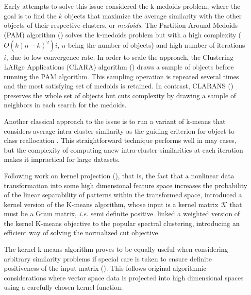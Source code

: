 \documentclass[10pt,journal,compsoc]{IEEEtran}
\begin{document}
Early attempts to solve this issue considered the k-medoids problem, where the goal is to find the $k$ objects that maximize the average similarity with the other objects of their respective clusters, or \emph{medoids}. The Partition Around Medoids (PAM) algorithm (\cite{KaufmanRousseeuw90}) solves the k-medoids problem but with a high complexity ($O(k(n-k)^2)i$, $n$ being the number of objects) and high number of iterations $i$, due to low convergence rate. In order to scale the approach, the Clustering LARge Applications (CLARA) algorithm (\cite{KaufmanRousseeuw90}) draws a sample of objects before running the PAM algorithm. This sampling operation is repeated several times and the most satisfying set of medoids is retained. In contrast, CLARANS (\cite{Ng:1994:EEC:645920.672827}) preserves the whole set of objects but cuts complexity by  drawing a sample of neighbors in each search for the medoids.

Another classical approach to the issue is to run a variant of k-means that considers average intra-cluster similarity as the guiding criterion for object-to-class reallocation \cite[Chapter 10.7]{Duda01}. This straightforward technique performs well in may cases, but the complexity of computing anew intra-cluster similarities at each iteration makes it impractical for large datasets.

Following work on kernel projection (\cite{Vapnik:1995:NSL:211359}), that is, the fact that a nonlinear data transformation into some high dimensional feature space increases the probability of the linear separability of patterns within the transformed space, \cite{Girolami:2002:MKC:2325785.2326903} introduced a kernel version of the K-means algorithm, whose input is a kernel matrix $\mathcal{K}$ that must be a Gram matrix, \textit{i.e.} semi definite positive. \cite{Dhillon:2007:WGC:1313055.1313291} linked a weighted version of the kernel K-means objective to the popular spectral clustering, introducing an efficient way of solving the normalized cut objective.

The kernel k-means algorithm proves to be equally useful when considering arbitrary similarity problems if special care is taken to ensure definite positiveness of the input matrix (\cite{Roth:2003:OCP:960254.960291}). This follows original algorithmic considerations where vector space data is projected into high dimensional spaces using a carefully chosen kernel function. 
\end{document}
